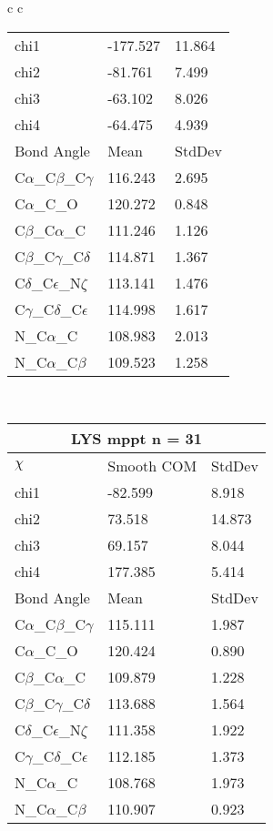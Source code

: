\begin{longtable}{ c c }
\begin{tabular}{ l l l }
  chi1 & -177.527 & 11.864 \\ 
  chi2 & -81.761 & 7.499 \\ 
  chi3 & -63.102 & 8.026 \\ 
  chi4 & -64.475 & 4.939 \\ \midrule
  Bond Angle   & Mean     & StdDev \\ \midrule
  C$\alpha$\_C$\beta$\_C$\gamma$ & 116.243 & 2.695\\
  C$\alpha$\_C\_O & 120.272 & 0.848\\
  C$\beta$\_C$\alpha$\_C & 111.246 & 1.126\\
  C$\beta$\_C$\gamma$\_C$\delta$ & 114.871 & 1.367\\
  C$\delta$\_C$\epsilon$\_N$\zeta$ & 113.141 & 1.476\\
  C$\gamma$\_C$\delta$\_C$\epsilon$ & 114.998 & 1.617\\
  N\_C$\alpha$\_C & 108.983 & 2.013\\
  N\_C$\alpha$\_C$\beta$ & 109.523 & 1.258\\
  \bottomrule
  \end{tabular}
  \\
  \begin{tabular}{ l l l }
  \toprule
  \multicolumn{3}{c}{LYS \textbf{mppt} n = 31} \\ \toprule
  $\chi$       & Smooth COM & StdDev \\ \midrule
  chi1 & -82.599 & 8.918 \\ 
  chi2 & 73.518 & 14.873 \\ 
  chi3 & 69.157 & 8.044 \\ 
  chi4 & 177.385 & 5.414 \\ \midrule
  Bond Angle   & Mean     & StdDev \\ \midrule
  C$\alpha$\_C$\beta$\_C$\gamma$ & 115.111 & 1.987\\
  C$\alpha$\_C\_O & 120.424 & 0.890\\
  C$\beta$\_C$\alpha$\_C & 109.879 & 1.228\\
  C$\beta$\_C$\gamma$\_C$\delta$ & 113.688 & 1.564\\
  C$\delta$\_C$\epsilon$\_N$\zeta$ & 111.358 & 1.922\\
  C$\gamma$\_C$\delta$\_C$\epsilon$ & 112.185 & 1.373\\
  N\_C$\alpha$\_C & 108.768 & 1.973\\
  N\_C$\alpha$\_C$\beta$ & 110.907 & 0.923\\
  \bottomrule
  \end{tabular}

\end{longtable}
